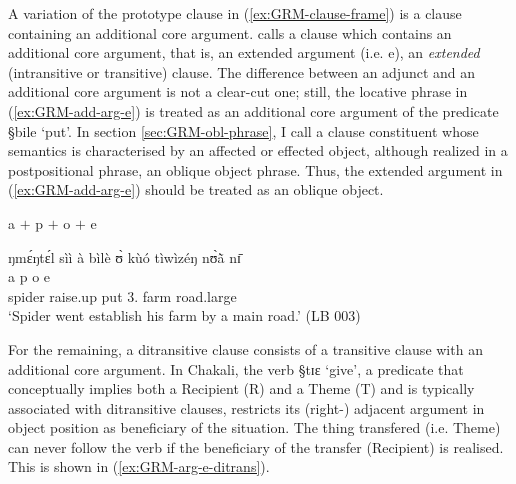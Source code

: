 
A variation of the prototype  clause in (\ref{ex:GRM-clause-frame}) is a
clause containing an additional core argument.  \citet[116]{Dixo10b} calls  a
clause which contains an
additional core argument, that is,  an extended argument (i.e. {\sc e}), an
{\it extended} (intransitive or transitive) clause. The
difference between an adjunct and an additional core argument is not a clear-cut
one;   still,   the locative phrase in (\ref{ex:GRM-add-arg-e}) is treated as
  an additional core argument of the predicate {\S bile} `put'. In section
\ref{sec:GRM-obl-phrase}, I call a clause constituent whose semantics is
characterised by an  affected or effected object, although realized in a
postpositional phrase, an oblique object phrase. Thus, the extended argument
in (\ref{ex:GRM-add-arg-e}) should be treated as an oblique object. 


\begin{exe}
\ex\label{ex:GRM-add-arg-e}{{\sc a} $+$ {\sc p}  $+$  {\sc o} $+$   {\sc e}}

\glll ŋmɛ́ŋtɛ́l {sìì    à    bìlè}  {ʊ̀  kùó}  {tìwìzéŋ nʊ̀ã̀  nɪ̄}\\
{\sc a} {\sc p}   {\sc o}   {\sc e}\\
spider  	{raise.up   {\conn}    put}  	{{3\sg.\poss} 	farm } 
{road.large     {\reln}  {\postp}}\\

\glt  `Spider went establish his farm by a main road.' (LB 003)

\end{exe}

For the remaining, a ditransitive clause consists of a transitive clause with an
additional core argument.  In Chakali, the verb {\S tɪɛ} `give', a predicate 
that conceptually implies both a Recipient (R)  and a Theme (T) and is typically
associated with ditransitive clauses, restricts its (right-) adjacent argument
in object position as  beneficiary of the situation. The thing transfered
(i.e. Theme) can never follow the verb if the beneficiary of the transfer
(Recipient) is realised. This is shown in (\ref{ex:GRM-arg-e-ditrans}).

